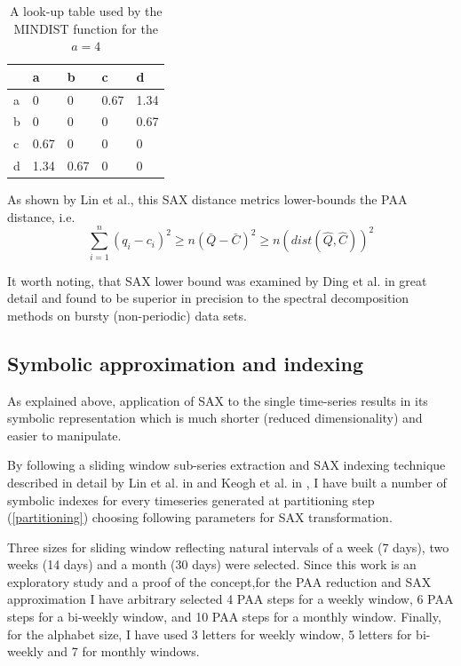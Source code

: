 \documentclass[conference]{worldcomp}
\begin{document}
\begin{table}
\begin{tabularx}{240pt}{X X X X X}
\hline
   & a   & b    & c    & d    \\
\hline
a & 0    & 0    & 0.67 & 1.34 \\
b & 0    & 0    & 0    & 0.67 \\
c & 0.67 & 0    & 0    & 0    \\
d & 1.34 & 0.67 & 0    & 0    \\
\hline
\end{tabularx}
\caption{A look-up table used by the MINDIST function for the $a=4$}
\label{tbl:sax_lookup}
\end{table}

As shown by Lin et al., this SAX distance metrics lower-bounds the PAA distance, i.e.
\begin{equation}
\sum_{i=1}^{n} (q_{i} - c_{i})^{2} \geq n(\bar{Q} - \bar{C})^{2} \geq n(dist(\hat{Q},\hat{C}))^2
\label{eq:sax_bounding}
\end{equation}

It worth noting, that SAX lower bound was examined by Ding et al. \cite{citeulike:4501572} in 
great detail and found to be superior in precision to the spectral decomposition methods 
on bursty (non-periodic) data sets.

\subsection{Symbolic approximation and indexing}
As explained above, application of SAX to the single time-series results in its symbolic 
representation which is much shorter (reduced dimensionality) and easier to manipulate. 

By following a sliding window sub-series extraction and SAX indexing technique described 
in detail by Lin et al. in \cite{citeulike:2821475} and Keogh et al. in 
\cite{citeulike:532335}, I have built a number of symbolic indexes for every timeseries 
generated at partitioning step (\ref{partitioning}) choosing following parameters for 
SAX transformation. 

Three sizes for sliding window reflecting natural intervals of a week (7 days), 
two weeks (14 days) and a month (30 days) were selected. Since this work is an exploratory 
study and a proof of the concept,for the PAA reduction and SAX approximation I have
arbitrary selected 4 PAA steps for a weekly window, 6 PAA steps for a bi-weekly window,
and 10 PAA steps for a monthly window. Finally, for the alphabet size, I have used 3 letters 
for weekly window, 5 letters for bi-weekly and 7 for monthly windows.
\end{document}

